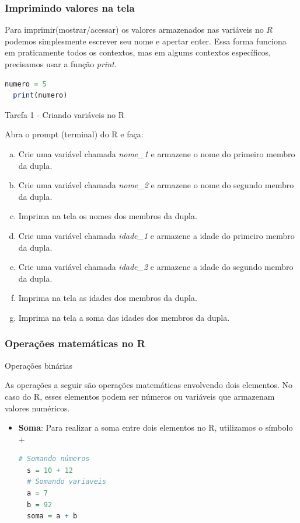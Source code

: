 \documentclass{beamer}
\begin{document}
\begin{frame}[fragile]
\frametitle{{Imprimindo valores na tela}}
Para imprimir(mostrar/acessar) os valores armazenados nas variáveis no $R$ podemos simplesmente escrever seu nome e apertar enter. 
Essa forma funciona em praticamente todos os contextos, mas em algums contextos específicos, precisamos usar a função \textit{print}.

\begin{lstlisting}[language=R]
  numero = 5
  print(numero)
\end{lstlisting}
\end{frame}

\begin{frame}{Tarefa 1 - Criando variáveis no R}

  \begin{exercicio}
  Abra o prompt (terminal) do R e faça:

  \begin{enumerate}[a)]
    \item Crie uma variável chamada \textit{nome\_1} e armazene o nome do primeiro membro da dupla.
    \item Crie uma variável chamada \textit{nome\_2} e armazene o nome do segundo membro da dupla.
    \item Imprima na tela os nomes dos membros da dupla. 
    \item Crie uma variável chamada \textit{idade\_1} e armazene a idade do primeiro membro da dupla. 
    \item Crie uma variável chamada \textit{idade\_2} e armazene a idade do segundo membro da dupla.
    \item Imprima na tela as idades dos membros da dupla. 
    \item Imprima na tela a soma das idades dos membros da dupla. 
  \end{enumerate}
  \end{exercicio}
  
\end{frame}

\begin{frame}[fragile]
\frametitle{Operações matemáticas no R} 
  {\color{gray}\large Operações binárias}

  As operações a seguir são operações matemáticas envolvendo dois elementos. No caso do R, esses elementos podem ser números ou variáveis que armazenam valores
  numéricos.
    \begin{itemize}
    \item \textbf{Soma}: Para realizar a soma entre dois elementos no R, utilizamos o símbolo $+$
    \begin{lstlisting}[language=R]
  # Somando números
  s = 10 + 12
  # Somando variaveis
  a = 7
  b = 92
  soma = a + b
  \end{lstlisting}
  \end{itemize}
\end{frame}
\end{document}
